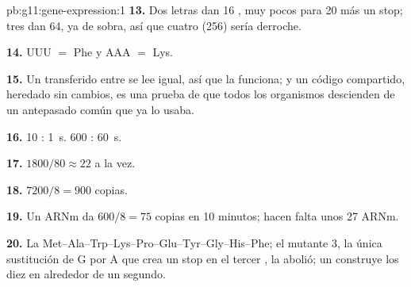 \begin{solution}{pb:g11:gene-expression:1}
\textbf{13.} Dos letras dan 16 , muy pocos para 20 
más un stop; tres dan 64, ya de sobra, así que cuatro (256) sería
derroche.

\textbf{14.} UUU $=$ Phe y AAA $=$ Lys.

\textbf{15.} Un  transferido entre  se lee igual, así que la
 funciona; y un código compartido, heredado sin cambios, es
una prueba de que todos los organismos descienden de un antepasado
común que ya lo usaba.

\textbf{16.} 10 : \qty{1}{s}. 600 : \qty{60}{s}.

\textbf{17.} $1800/80 \approx 22$  a la vez.

\textbf{18.} $7200/8 = 900$ copias.

\textbf{19.} Un ARNm da $600/8 = 75$ copias en 10 minutos; hacen falta
unos 27 ARNm.

\textbf{20.} La 
Met--Ala--Trp--Lys--Pro--Glu--Tyr--Gly--His--Phe; el mutante 3, la
única sustitución de G por A que crea un stop en el tercer , la
abolió; un  construye los diez  en alrededor de un
segundo.
\end{solution}
